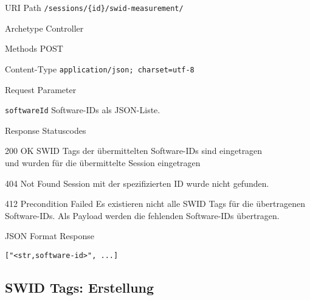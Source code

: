 \documentclass[10pt,a4paper]{scrartcl}
\begin{document}
\begin{mdframed}[style=def]
\begin{description*}
	\item[URI Path] \texttt{/sessions/\{id\}/swid-measurement/}
	\item[Archetype] Controller
	\item[Methods] POST
	\item[Content-Type] \texttt{application/json; charset=utf-8}
	\item[Request Parameter] \hfill
	\begin{description*}
		\item[\texttt{softwareId}] Software-IDs als JSON-Liste.
	\end{description*}
	\item[Response Statuscodes] \hfill
		\begin{description*}
			\item[200 OK] SWID Tags der übermittelten Software-IDs sind eingetragen \\
				und wurden für die übermittelte Session eingetragen
			\item[404 Not Found] Session mit der spezifizierten ID wurde nicht gefunden. 
			\item[412 Precondition Failed] Es existieren nicht alle SWID Tags für die
				übertragenen Software-IDs. Als Payload werden die fehlenden Software-IDs
				übertragen.
		\end{description*}
	\item[JSON Format Response] \hfill
\begin{lstlisting}
["<str,software-id>", ...]
\end{lstlisting}
\end{description*}
\end{mdframed}


\subsection{SWID Tags: Erstellung}
\label{api:create}
\end{document}
